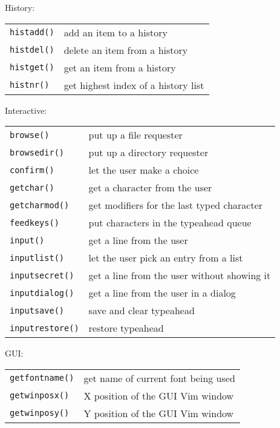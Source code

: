 History:
\label{history-functions}
\begin{center} \begin{tabular}{l l}
				\texttt{histadd()} & add an item to a history \\
				\texttt{histdel()} & delete an item from a history \\
				\texttt{histget()} & get an item from a history \\
				\texttt{histnr()} & get highest index of a history list \\
\end{tabular} \end{center}

Interactive:
\label{interactive-functions}
\begin{center} \begin{tabular}{l l}
				\texttt{browse()} & put up a file requester \\
				\texttt{browsedir()} & put up a directory requester \\
				\texttt{confirm()} & let the user make a choice \\
				\texttt{getchar()} & get a character from the user \\
				\texttt{getcharmod()} & get modifiers for the last typed character \\
				\texttt{feedkeys()} & put characters in the typeahead queue \\
				\texttt{input()} & get a line from the user \\
				\texttt{inputlist()} & let the user pick an entry from a list \\
				\texttt{inputsecret()} & get a line from the user without showing it \\
				\texttt{inputdialog()} & get a line from the user in a dialog \\
				\texttt{inputsave()} & save and clear typeahead \\
				\texttt{inputrestore()} & restore typeahead \\
\end{tabular} \end{center}

GUI:
\label{gui-functions}
\begin{center} \begin{tabular}{l l}
				\texttt{getfontname()} & get name of current font being used \\
				\texttt{getwinposx()} & X position of the GUI Vim window \\
				\texttt{getwinposy()} & Y position of the GUI Vim window \\
\end{tabular} \end{center}

